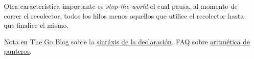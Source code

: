 \documentclass{article}
\begin{document}
Otra característica importante es \textit{stop-the-world} el cual pausa, al momento de correr el recolector, todos los hilos menos aquellos que utilice el recolector hasta que finalice el mismo. 

\begin{thebibliography}{99}
 Nota en The Go Blog sobre la \href{http://blog.golang.org/gos-declaration-syntax}{sintáxis de la declaración}.
 FAQ sobre \href{https://golang.org/doc/faq#no_pointer_arithmetic}{aritmética de punteros}.
\end{thebibliography}
\end{document}
